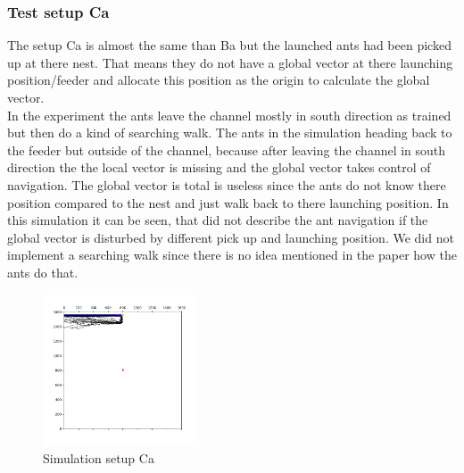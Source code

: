 \documentclass[11pt]{article}
\begin{document}
	\subsubsection{Test setup Ca}
		The setup Ca is almost the same than Ba but the launched ants had been picked up at there nest. That means they do not have a global vector at there launching position/feeder and allocate this position as the origin to calculate the global vector. \\
In the experiment the ants leave the channel mostly in south direction as trained but then do a kind of searching walk. The ants in the simulation heading back to the feeder but outside of the channel, because after leaving the channel in south direction the the local vector is missing and the global vector takes control of navigation. The global vector is total is useless since the ants do not know there position compared to the nest and just walk back to there launching position. In this simulation it can be seen, that \cite{wehner} did not describe the ant navigation if the global vector is disturbed by different pick up and launching position. We did not implement a searching walk since there is no idea mentioned in the paper how the ants do that.
\begin{figure}
	\includegraphics[width=0.4\textwidth]{test_Ca.png}
	\caption{Simulation setup Ca}
	\label{fig:Ca}
\end{figure}
\end{document}
